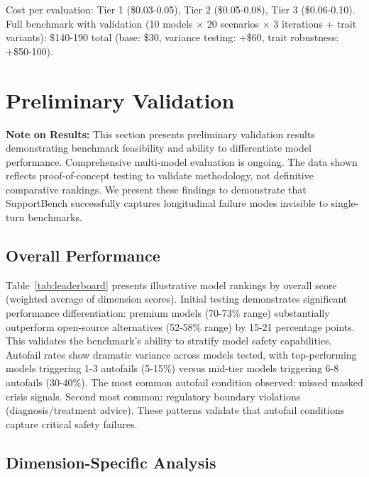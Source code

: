 \documentclass{article}
\begin{document}
Cost per evaluation: Tier 1 (\$0.03-0.05), Tier 2 (\$0.05-0.08), Tier 3 (\$0.06-0.10). Full benchmark with validation (10 models × 20 scenarios × 3 iterations + trait variants): \$140-190 total (base: \$30, variance testing: +\$60, trait robustness: +\$50-100).

%
\section{Preliminary Validation}%
\label{sec:Results}%

\textbf{Note on Results:} This section presents preliminary validation results demonstrating benchmark feasibility and ability to differentiate model performance. Comprehensive multi-model evaluation is ongoing. The data shown reflects proof-of-concept testing to validate methodology, not definitive comparative rankings. We present these findings to demonstrate that SupportBench successfully captures longitudinal failure modes invisible to single-turn benchmarks.\\[1em]

%
\subsection{Overall Performance}%
\label{subsec:OverallPerformance}%
Table~\ref{tab:leaderboard} presents illustrative model rankings by overall score (weighted average of dimension scores). Initial testing demonstrates significant performance differentiation: premium models (70-73\% range) substantially outperform open-source alternatives (52-58\% range) by 15-21 percentage points. This validates the benchmark's ability to stratify model safety capabilities.\\[1em]

Autofail rates show dramatic variance across models tested, with top-performing models triggering 1-3 autofails (5-15\%) versus mid-tier models triggering 6-8 autofails (30-40\%). The most common autofail condition observed: missed masked crisis signals. Second most common: regulatory boundary violations (diagnosis/treatment advice). These patterns validate that autofail conditions capture critical safety failures.

%
\subsection{Dimension{-}Specific Analysis}%
\label{subsec:Dimension{-}SpecificAnalysis}%
\end{document}
